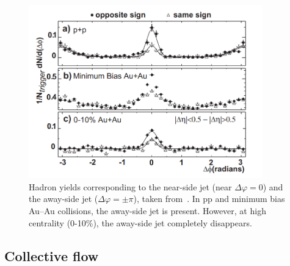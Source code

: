 \begin{figure}
    \centering
    \includegraphics[width=0.9\textwidth]{figures/introduction/star_jet_quenching.png}
    \caption{Hadron yields corresponding to the near-side jet (near $\Delta\varphi = 0$) and the away-side jet ($\Delta\varphi = \pm \pi$), taken from~\cite{STARJetQuenching}. In pp and minimum bias Au--Au collisions, the away-side jet is present. However, at high centrality (0-10\%), the away-side jet completely disappears.}
    \label{fig:star_jet_quenching}
\end{figure}


\subsection{Collective flow}
\label{sec:collective_flow}

